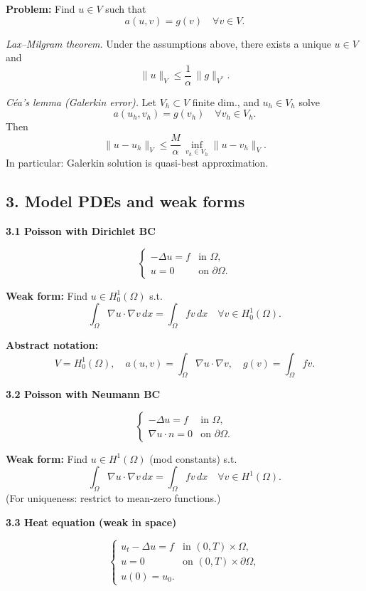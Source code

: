 \textbf{Problem:} Find $u\in V$ such that
\[
    a(u,v) = g(v) \quad\forall v\in V.
\]

\emph{Lax--Milgram theorem.}
Under the assumptions above, there exists a unique $u\in V$ and
\[
    \|u\|_V \le \frac{1}{\alpha}\,\|g\|_{V^\ast}.
\]

\emph{Céa's lemma (Galerkin error).}
Let $V_h\subset V$ finite dim., and $u_h\in V_h$ solve
\[
    a(u_h,v_h) = g(v_h)\quad\forall v_h\in V_h.
\]
Then
\[
    \|u-u_h\|_V \le \frac{M}{\alpha}\,\inf_{v_h\in V_h}\|u-v_h\|_V.
\]
In particular: Galerkin solution is quasi-best approximation.

\subsection*{3. Model PDEs and weak forms}

\textbf{3.1 Poisson with Dirichlet BC}

\[
    \begin{cases}
        - \Delta u = f & \text{in } \Omega,         \\
        u = 0          & \text{on } \partial\Omega.
    \end{cases}
\]

\textbf{Weak form:} Find $u\in H_0^1(\Omega)$ s.t.
\[
    \int_\Omega \nabla u\cdot\nabla v\,dx = \int_\Omega f v\,dx
    \quad\forall v\in H_0^1(\Omega).
\]

\textbf{Abstract notation:}
\[
    V = H_0^1(\Omega),\quad
    a(u,v)=\int_\Omega \nabla u\cdot\nabla v,\quad
    g(v)=\int_\Omega f v.
\]

\textbf{3.2 Poisson with Neumann BC}

\[
    \begin{cases}
        - \Delta u = f      & \text{in } \Omega,        \\
        \nabla u\cdot n = 0 & \text{on }\partial\Omega.
    \end{cases}
\]

\textbf{Weak form:} Find $u\in H^1(\Omega)$ (mod constants) s.t.
\[
    \int_\Omega \nabla u\cdot\nabla v\,dx = \int_\Omega f v\,dx
    \quad\forall v\in H^1(\Omega).
\]
(For uniqueness: restrict to mean-zero functions.)

\textbf{3.3 Heat equation (weak in space)}

\[
    \begin{cases}
        u_t - \Delta u = f & \text{in } (0,T)\times\Omega,         \\
        u = 0              & \text{on } (0,T)\times\partial\Omega, \\
        u(0)=u_0.
    \end{cases}
\]

